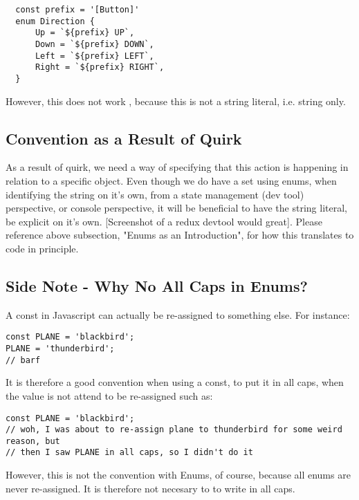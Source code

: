 \begin{lstlisting}
  const prefix = '[Button]'
  enum Direction {
      Up = `${prefix} UP`,
      Down = `${prefix} DOWN`,
      Left = `${prefix} LEFT`,
      Right = `${prefix} RIGHT`,
  }
\end{lstlisting}

However, this does not work , because this is not a string literal, i.e. string
only.

\subsection{ Convention as a Result of Quirk }
As a result of quirk, we need a way of specifying that this action is happening
in relation to a specific object. Even though we do have a set using enums,
when identifying the string on it's own, from a state management (dev tool)
perspective, or console perspective, it will be beneficial to have the string
literal, be explicit on it's own. [Screenshot of a redux devtool would great].
Please reference above subsection, "Enums as an Introduction", for how this
translates to code in principle.

\subsection{ Side Note - Why No All Caps in Enums? }
A const in Javascript can actually be re-assigned to something else. For
instance:
\begin{lstlisting}
const PLANE = 'blackbird';
PLANE = 'thunderbird';
// barf
\end{lstlisting}
It is therefore a good convention when using a const, to put it in all caps,
when the value is not attend to be re-assigned such as:
\begin{lstlisting}
const PLANE = 'blackbird';
// woh, I was about to re-assign plane to thunderbird for some weird reason, but
// then I saw PLANE in all caps, so I didn't do it
\end{lstlisting}

However, this is not the convention with Enums, of course, because all enums
are never re-assigned. It is therefore not necesary to to write in all caps.
